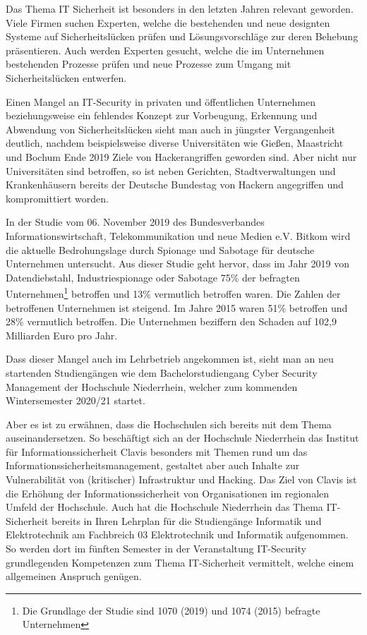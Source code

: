 \label{chap_text:Einleitung}
Das Thema IT Sicherheit ist besonders in den letzten Jahren relevant geworden. Viele Firmen suchen Experten\cite{it-daily.netITSecurityExpertenWerdenHanderingend2019}, welche die bestehenden und neue designten Systeme auf Sicherheitslücken prüfen und Lösungsvorschläge zur deren Behebung präsentieren. Auch werden Experten gesucht, welche die im Unternehmen bestehenden Prozesse prüfen und neue Prozesse zum Umgang mit Sicherheitslücken entwerfen.

Einen Mangel an IT-Security in privaten und öffentlichen Unternehmen beziehungsweise ein fehlendes Konzept zur Vorbeugung, Erkennung und Abwendung von Sicherheitslücken sieht man auch in jüngster Vergangenheit deutlich, nachdem beispielsweise diverse Universitäten wie Gießen, Maastricht und Bochum Ende 2019 Ziele von Hackerangriffen geworden sind. Aber nicht nur Universitäten sind betroffen, so ist neben Gerichten, Stadtverwaltungen und Krankenhäusern bereits der Deutsche Bundestag von Hackern angegriffen und kompromittiert worden.

In der Studie  vom 06. November 2019 des Bundesverbandes Informationswirtschaft, Telekommunikation und neue Medien e.V. Bitkom wird die aktuelle Bedrohungslage durch Spionage und Sabotage für deutsche Unternehmen untersucht. Aus dieser Studie geht hervor, dass im Jahr 2019 von Datendiebstahl, Industriespionage oder Sabotage 75\% der befragten Unternehmen\footnote{Die Grundlage der Studie sind 1070 (2019) und 1074 (2015) befragte Unternehmen} betroffen  und 13\% vermutlich betroffen waren. Die Zahlen der betroffenen Unternehmen ist steigend. Im Jahre 2015 waren  51\% betroffen und 28\% vermutlich betroffen. Die Unternehmen beziffern den Schaden auf 102,9 Milliarden Euro pro Jahr.\cite{bergWirtschaftsschutzDigitalenWelt2019}

Dass dieser Mangel auch im Lehrbetrieb angekommen ist, sieht man an neu startenden Studiengängen wie dem Bachelorstudiengang Cyber Security Management der Hochschule Niederrhein, welcher zum kommenden Wintersemester 2020/21 startet.\cite{hochschuleniederrheinHackernRoteKarte2020}

Aber es ist zu erwähnen, dass die Hochschulen sich bereits mit dem Thema auseinandersetzen. 
So beschäftigt sich an der Hochschule Niederrhein das Institut für Informationssicherheit Clavis besonders mit Themen rund um das Informationssicherheitsmanagement, gestaltet aber auch Inhalte zur Vulnerabilität von (kritischer) Infrastruktur und Hacking.
Das Ziel von Clavis ist die Erhöhung der Informationssicherheit von Organisationen im regionalen Umfeld der Hochschule.
\cite{hochschuleniederrheinFlyerInstitutClavis}
Auch hat die Hochschule Niederrhein das Thema IT-Sicherheit bereits in Ihren Lehrplan für die Studiengänge Informatik und Elektrotechnik am Fachbreich 03 Elektrotechnik und Informatik aufgenommen. So werden dort im fünften Semester in der Veranstaltung IT-Security grundlegenden Kompetenzen zum Thema IT-Sicherheit vermittelt, welche einem allgemeinen Anspruch genügen.\cite{hochschuleniederrheinModulhandbuchVollzeitBA2019}